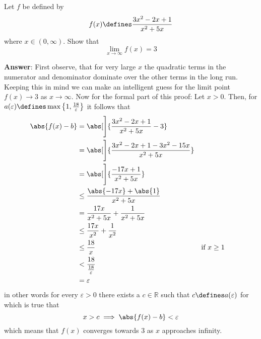 \begin{exm}\label{exm-infinity-limit:1}
    Let $f$ be defined by \cite[p.71]{wuest2009}
    \begin{equation*}
        f(x)\defines\frac{3x^2-2x+1}{x^2+5x}
    \end{equation*}
    where $x\in(0,\infty)$. Show that
    \begin{equation*}
        \lim_{x \to \infty}f(x)=3
    \end{equation*} 
    \begin{flushleft}
        \textbf{Answer}: First observe, that for very large $x$ the quadratic terms
        in the numerator and denominator dominate over the other terms in the long
        run. Keeping this in mind we can make an intelligent guess for the limit point
        $f(x) \to 3$ as $x \to \infty$. Now for the formal part of this proof: Let $x>0$.
        Then, for $a(\varepsilon)\defines\max\left\{1,\tfrac{18}{\varepsilon}\right\}$ it
        follows that
        \begin{align*}
            \abs{f(x) - b} &= \abs[\Bigg]{\frac{3x^2-2x+1}{x^2+5x}-3}\\
                           &= \abs[\Bigg]{\frac{3x^2-2x+1-3x^2-15x}{x^2+5x}}\\
                           &= \abs[\Bigg]{\frac{-17x+1}{x^2+5x}}\\
                           &\leq {\frac{\abs{-17x}+\abs{1}}{x^2+5x}}\\
                           &= \frac{17x}{x^2+5x} + \frac{1}{x^2+5x}\\
                           &\leq \frac{17x}{x^2} + \frac{1}{x^2}\\
                           &\leq \frac{18}{x} && \text{if } x\geq1\\
                           &< \frac{18}{\tfrac{18}{\varepsilon}}\\
                           &= \varepsilon
        \end{align*}
        in other words for every $\varepsilon>0$ there exists a $c\in\mathbb{R}$
        such that $c\defines a(\varepsilon)$ for which is true that
        \begin{equation*}
            x>c \implies \abs{f(x)-b}<\varepsilon
        \end{equation*}
        which means that $f(x)$ converges towards $3$ as $x$ approaches infinity.
    \end{flushleft}
\end{exm}

